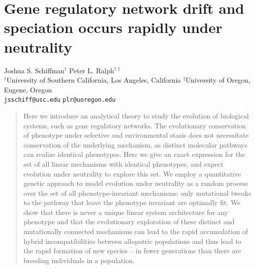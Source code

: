 \documentclass{article}
\newcommand{\1}{\mathbbm{1}}
\begin{document}
\section*{Gene regulatory network drift and speciation occurs rapidly under neutrality}
{\centering
Joshua S. Schiffman$^{\dagger}$ \qquad Peter L. Ralph$^{\dagger \ddagger}$ \\
$^{\dagger}$University of Southern California, Los Angeles, California \qquad 
$^{\ddagger}$University of Oregon, Eugene, Oregon \\
\texttt{jsschiff@usc.edu} \qquad 
\texttt{plr@uoregon.edu}
\\
}

% 
% 
% 
% 
% 
% 
% 



\begin{abstract}
Here we introduce an analytical theory to study the evolution of biological systems, such as gene regulatory networks. The evolutionary conservation of phenotype under selective and environmental stasis does not necessitate conservation of the underlying mechanism, as distinct molecular pathways can realize identical phenotypes. Here we give an exact expression for the set of all linear mechanisms with identical phenotypes, and expect evolution under neutrality to explore this set. We employ a quantitative genetic approach to model evolution under neutrality as a random process over the set of all phenotype-invariant mechanisms: only mutational tweaks to the pathway that leave the phenotype invariant are optimally fit. We show that there is never a unique linear system architecture for any phenotype and that the evolutionary exploration of these distinct and mutationally connected mechanisms can lead to the rapid accumulation of hybrid incompatibilities between allopatric populations and thus lead to the rapid formation of new species -- in fewer generations than there are breeding individuals in a population.
\end{abstract}
\end{document}
